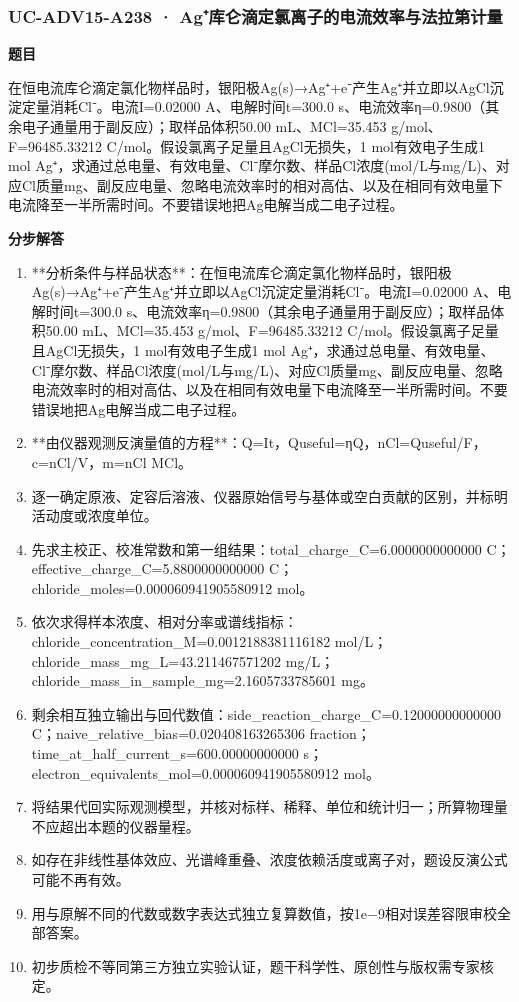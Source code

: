 \documentclass[UTF8,11pt,a4paper]{ctexart}
\begin{document}
\subsubsection*{UC-ADV15-A238 · Ag⁺库仑滴定氯离子的电流效率与法拉第计量}
\noindent\textbf{题目}\par
在恒电流库仑滴定氯化物样品时，银阳极Ag(s)→Ag⁺+e⁻产生Ag⁺并立即以AgCl沉淀定量消耗Cl⁻。电流I=0.02000 A、电解时间t=300.0 s、电流效率η=0.9800（其余电子通量用于副反应）；取样品体积50.00 mL、MCl=35.453 g/mol、F=96485.33212 C/mol。假设氯离子足量且AgCl无损失，1 mol有效电子生成1 mol Ag⁺，求通过总电量、有效电量、Cl⁻摩尔数、样品Cl浓度(mol/L与mg/L)、对应Cl质量mg、副反应电量、忽略电流效率时的相对高估、以及在相同有效电量下电流降至一半所需时间。不要错误地把Ag电解当成二电子过程。\par
\medskip\noindent\textbf{分步解答}
\begin{enumerate}
\item **分析条件与样品状态**：在恒电流库仑滴定氯化物样品时，银阳极Ag(s)→Ag⁺+e⁻产生Ag⁺并立即以AgCl沉淀定量消耗Cl⁻。电流I=0.02000 A、电解时间t=300.0 s、电流效率η=0.9800（其余电子通量用于副反应）；取样品体积50.00 mL、MCl=35.453 g/mol、F=96485.33212 C/mol。假设氯离子足量且AgCl无损失，1 mol有效电子生成1 mol Ag⁺，求通过总电量、有效电量、Cl⁻摩尔数、样品Cl浓度(mol/L与mg/L)、对应Cl质量mg、副反应电量、忽略电流效率时的相对高估、以及在相同有效电量下电流降至一半所需时间。不要错误地把Ag电解当成二电子过程。
\item **由仪器观测反演量值的方程**：Q=It，Quseful=ηQ，nCl=Quseful/F，c=nCl/V，m=nCl MCl。
\item 逐一确定原液、定容后溶液、仪器原始信号与基体或空白贡献的区别，并标明活动度或浓度单位。
\item 先求主校正、校准常数和第一组结果：total\_charge\_C=6.0000000000000 C；effective\_charge\_C=5.8800000000000 C；chloride\_moles=0.000060941905580912 mol。
\item 依次求得样本浓度、相对分率或谱线指标：chloride\_concentration\_M=0.0012188381116182 mol/L；chloride\_mass\_mg\_L=43.211467571202 mg/L；chloride\_mass\_in\_sample\_mg=2.1605733785601 mg。
\item 剩余相互独立输出与回代数值：side\_reaction\_charge\_C=0.12000000000000 C；naive\_relative\_bias=0.020408163265306 fraction；time\_at\_half\_current\_s=600.00000000000 s；electron\_equivalents\_mol=0.000060941905580912 mol。
\item 将结果代回实际观测模型，并核对标样、稀释、单位和统计归一；所算物理量不应超出本题的仪器量程。
\item 如存在非线性基体效应、光谱峰重叠、浓度依赖活度或离子对，题设反演公式可能不再有效。
\item 用与原解不同的代数或数字表达式独立复算数值，按1e−9相对误差容限审校全部答案。
\item 初步质检不等同第三方独立实验认证，题干科学性、原创性与版权需专家核定。
\end{enumerate}
\end{document}
